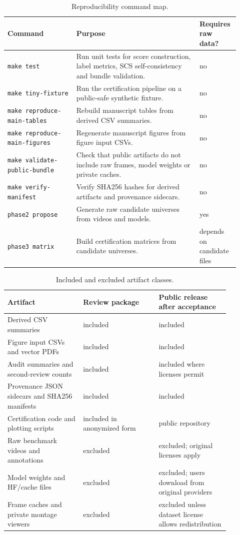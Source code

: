 \documentclass[11pt]{article}
\begin{document}
\begin{table}[h]
\centering
\caption{Reproducibility command map.}
\small
\begin{tabular}{p{0.28\linewidth}p{0.50\linewidth}p{0.14\linewidth}}
\toprule
Command & Purpose & Requires raw data? \\
\midrule
\texttt{make test} & Run unit tests for score construction, label metrics, SCS self-consistency and bundle validation. & no \\
\texttt{make tiny-fixture} & Run the certification pipeline on a public-safe synthetic fixture. & no \\
\texttt{make reproduce-main-tables} & Rebuild manuscript tables from derived CSV summaries. & no \\
\texttt{make reproduce-main-figures} & Regenerate manuscript figures from figure input CSVs. & no \\
\texttt{make validate-public-bundle} & Check that public artifacts do not include raw frames, model weights or private caches. & no \\
\texttt{make verify-manifest} & Verify SHA256 hashes for derived artifacts and provenance sidecars. & no \\
\texttt{phase2 propose} & Generate raw candidate universes from videos and models. & yes \\
\texttt{phase3 matrix} & Build certification matrices from candidate universes. & depends on candidate files \\
\bottomrule
\end{tabular}
\end{table}

\begin{table}[h]
\centering
\caption{Included and excluded artifact classes.}
\small
\begin{tabular}{p{0.30\linewidth}p{0.30\linewidth}p{0.28\linewidth}}
\toprule
Artifact & Review package & Public release after acceptance \\
\midrule
Derived CSV summaries & included & included \\
Figure input CSVs and vector PDFs & included & included \\
Audit summaries and second-review counts & included & included where licenses permit \\
Provenance JSON sidecars and SHA256 manifests & included & included \\
Certification code and plotting scripts & included in anonymized form & public repository \\
Raw benchmark videos and annotations & excluded & excluded; original licenses apply \\
Model weights and HF/cache files & excluded & excluded; users download from original providers \\
Frame caches and private montage viewers & excluded & excluded unless dataset license allows redistribution \\
\bottomrule
\end{tabular}
\end{table}
\end{document}
